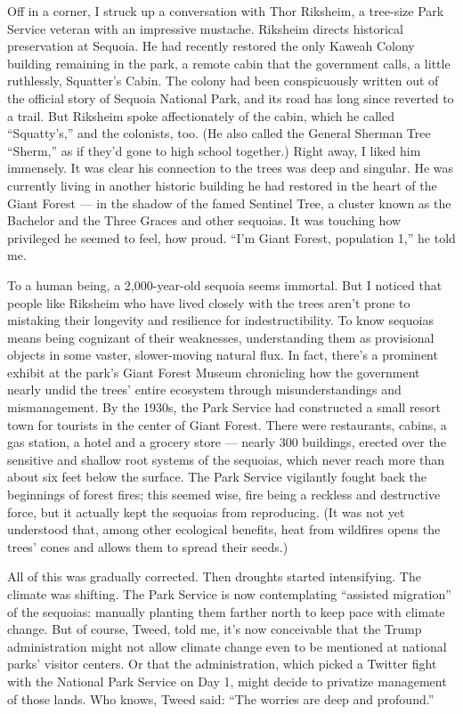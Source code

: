 Off in a corner, I struck up a conversation with Thor Riksheim, a
tree-size Park Service veteran with an impressive mustache. Riksheim
directs historical preservation at Sequoia. He had recently restored the
only Kaweah Colony building remaining in the park, a remote cabin that
the government calls, a little ruthlessly, Squatter's Cabin. The colony
had been conspicuously written out of the official story of Sequoia
National Park, and its road has long since reverted to a trail. But
Riksheim spoke affectionately of the cabin, which he called
``Squatty's,'' and the colonists, too. (He also called the General
Sherman Tree ``Sherm,'' as if they'd gone to high school together.)
Right away, I liked him immensely. It was clear his connection to the
trees was deep and singular. He was currently living in another historic
building he had restored in the heart of the Giant Forest --- in the
shadow of the famed Sentinel Tree, a cluster known as the Bachelor and
the Three Graces and other sequoias. It was touching how privileged he
seemed to feel, how proud. ``I'm Giant Forest, population 1,'' he told
me.

To a human being, a 2,000-year-old sequoia seems immortal. But I noticed
that people like Riksheim who have lived closely with the trees aren't
prone to mistaking their longevity and resilience for indestructibility.
To know sequoias means being cognizant of their weaknesses,
understanding them as provisional objects in some vaster, slower-moving
natural flux. In fact, there's a prominent exhibit at the park's Giant
Forest Museum chronicling how the government nearly undid the trees'
entire ecosystem through misunderstandings and mismanagement. By the
1930s, the Park Service had constructed a small resort town for tourists
in the center of Giant Forest. There were restaurants, cabins, a gas
station, a hotel and a grocery store --- nearly 300 buildings, erected
over the sensitive and shallow root systems of the sequoias, which never
reach more than about six feet below the surface. The Park Service
vigilantly fought back the beginnings of forest fires; this seemed wise,
fire being a reckless and destructive force, but it actually kept the
sequoias from reproducing. (It was not yet understood that, among other
ecological benefits, heat from wildfires opens the trees' cones and
allows them to spread their seeds.)

All of this was gradually corrected. Then droughts started intensifying.
The climate was shifting. The Park Service is now contemplating
``assisted migration'' of the sequoias: manually planting them farther
north to keep pace with climate change. But of course, Tweed, told me,
it's now conceivable that the Trump administration might not allow
climate change even to be mentioned at national parks' visitor centers.
Or that the administration, which picked a Twitter fight with the
National Park Service on Day 1, might decide to privatize management of
those lands. Who knows, Tweed said: ``The worries are deep and
profound.''

